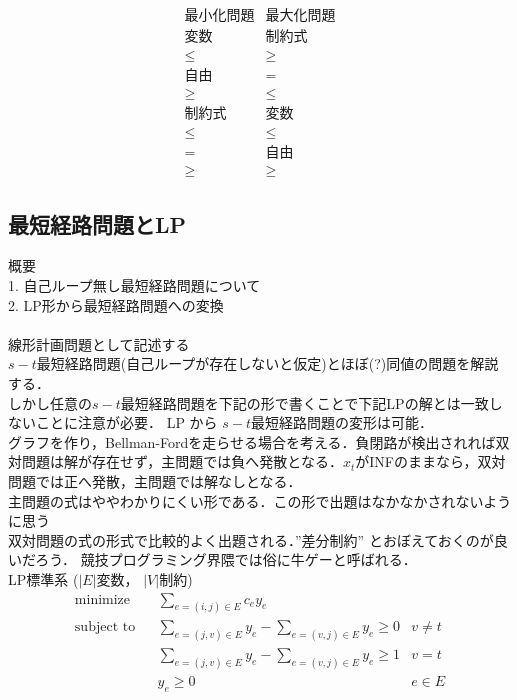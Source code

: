 \documentclass[13pt, a4paper, landscape]{jarticle}
\theoremstyle{nonitalic} %
\begin{document}
\begin{equation*}
\begin{array}{c|c}
  \textrm{最小化問題} &  \textrm{最大化問題} \\ \hline \hline
  \textrm{変数} &  \textrm{制約式} \\ \hline
  \leq & \geq \\
  \textrm{自由} & = \\
  \geq & \leq \\ \hline \hline
  \textrm{制約式} & \textrm{変数} \\ \hline
  \leq & \leq \\
   =   & \textrm{自由} \\
  \geq & \geq
\end{array}
\end{equation*}


\subsection{最短経路問題とLP}

概要 \\
1. 自己ループ無し最短経路問題について \\
2. LP形から最短経路問題への変換 \\
\\

線形計画問題として記述する \\
$s-t$最短経路問題(自己ループが存在しないと仮定)とほぼ(?)同値の問題を解説する． \\
しかし任意の$s-t$最短経路問題を下記の形で書くことで下記LPの解とは一致しないことに注意が必要． LP から $s-t$最短経路問題の変形は可能．\\
 グラフを作り，Bellman-Fordを走らせる場合を考える．負閉路が検出されれば双対問題は解が存在せず，主問題では負へ発散となる．$x_t$がINFのままなら，双対問題では正へ発散，主問題では解なしとなる．\\
主問題の式はややわかりにくい形である．この形で出題はなかなかされないように思う\\
双対問題の式の形式で比較的よく出題される．''差分制約'' とおぼえておくのが良いだろう． 競技プログラミング界隈では俗に牛ゲーと呼ばれる． \\

LP標準系
($|E|$変数， $|V|$制約)
\begin{align}
 &&&&&\textrm{minimize}   && \sum_{e=(i,j) \in E} c_e y_e \\
 &&&&&\textrm{subject to} && \sum_{e=(j,v) \in E} y_e - \sum_{e=(v,j) \in E} y_e \geq 0 & v\neq t  &&&&&\\
 &&&&&                    && \sum_{e=(j,v) \in E} y_e - \sum_{e=(v,j) \in E} y_e \geq 1 & v = t  &&&&&\\
 &&&&&                    &&  y_e \geq 0 & e \in E&&&&&
\end{align}
\end{document}
